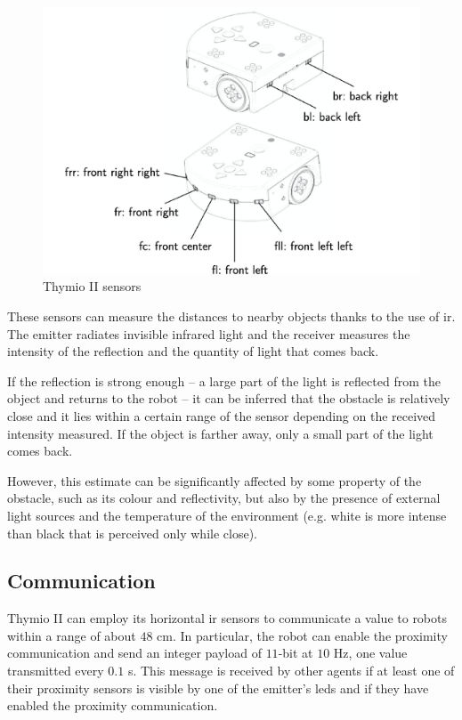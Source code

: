 \begin{figure}[h!tb]
	\centering
	\includegraphics[width=.6\textwidth]{contents/images/thymio2x}
	\caption{Thymio II sensors}
	\label{fig:thymio sensors}
\end{figure}

These sensors can measure the distances to nearby objects thanks to the use 
of  \gls{ir}. The emitter radiates invisible infrared light and the receiver 
measures the intensity of the reflection and the quantity of light that comes 
back.

If the reflection is strong enough – a large part of the light is reflected from 
the object and returns to the robot – it can be inferred that the obstacle is 
relatively close and it lies within a certain range of the sensor depending on 
the received intensity measured. If the object is farther away, only a small 
part of the light comes back.

However, this estimate can be significantly affected by some property of the 
obstacle, such as its colour and reflectivity, but also by the presence of 
external light sources and the temperature of the environment (e.g. white is 
more intense than black that is perceived only while close).

\subsection{Communication}
\label{subsec:thymiocomm}

Thymio II can employ its horizontal \gls{ir} sensors to communicate a value 
to robots within a range of about $48$ \gls{cm}. 
In particular, the robot can enable the proximity communication and send an 
integer payload of $11$-bit at $10$ \gls{Hz}, one value transmitted every $0.1$ 
\gls{s}. 
This message is received by other agents if at least one of their proximity sensors 
is visible by one of the emitter’s \glspl{led} and if they have enabled the proximity 
communication.

